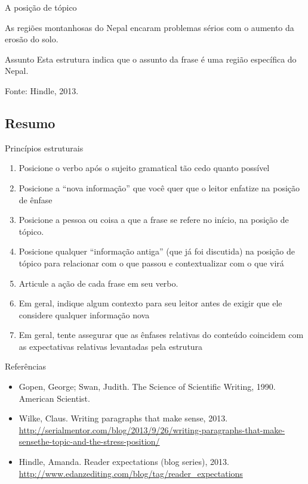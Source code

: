 \documentclass{beamer}
\begin{document}
\begin{frame}{A posição de tópico}
  \begin{example}
    As \alert<3->{regiões montanhosas do Nepal} encaram problemas sérios com o
    aumento da erosão do solo.
  \end{example}
  \begin{block}{Assunto}
    Esta estrutura indica que o assunto da frase é \alert<3->{uma
      região específica} do Nepal.
  \end{block}

  Fonte: Hindle, 2013.
\end{frame}

\subsection{Resumo}

\begin{frame}{Princípios estruturais}

  \begin{enumerate}
  \item Posicione o verbo após o sujeito gramatical tão cedo quanto
    possível
  \item Posicione a ``nova informação'' que você quer que o leitor
    enfatize na posição de ênfase
  \item Posicione a pessoa ou coisa a que a frase se refere no início,
    na posição de tópico.
  \item Posicione qualquer ``informação antiga'' (que já foi
    discutida) na posição de tópico para relacionar com o que passou e
    contextualizar com o que virá
  \item Articule a ação de cada frase em seu verbo.
  \item Em geral, indique algum contexto para seu leitor antes de
    exigir que ele considere qualquer informação nova
  \item Em geral, tente assegurar que as ênfases relativas do conteúdo
    coincidem com as expectativas relativas levantadas pela estrutura
  \end{enumerate}
\end{frame}

\begin{frame}{Referências}
  \begin{itemize}
  \item<1-> Gopen, George; Swan, Judith. The Science of Scientific
    Writing, 1990. American Scientist.
  \item<1-> Wilke, Claus. Writing paragraphs that make sense,
    2013. \url{http://serialmentor.com/blog/2013/9/26/writing-paragraphs-that-make-sensethe-topic-and-the-stress-position/}
  \item<1-> Hindle, Amanda. Reader expectations (blog series),
    2013. \url{http://www.edanzediting.com/blog/tag/reader_expectations}
  \end{itemize}
\end{frame}
\end{document}
